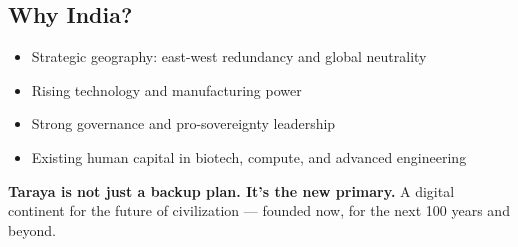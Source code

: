 \documentclass[12pt]{article}
\begin{document}
\begin{spacing}{1.15}
\section*{Why India?}
\begin{itemize}
  \item Strategic geography: east-west redundancy and global neutrality
  \item Rising technology and manufacturing power
  \item Strong governance and pro-sovereignty leadership
  \item Existing human capital in biotech, compute, and advanced engineering
\end{itemize}

\vspace{1em}
\noindent
\textbf{Taraya is not just a backup plan. It's the new primary.}  
A digital continent for the future of civilization — founded now, for the next 100 years and beyond.

\end{spacing}
\end{document}
